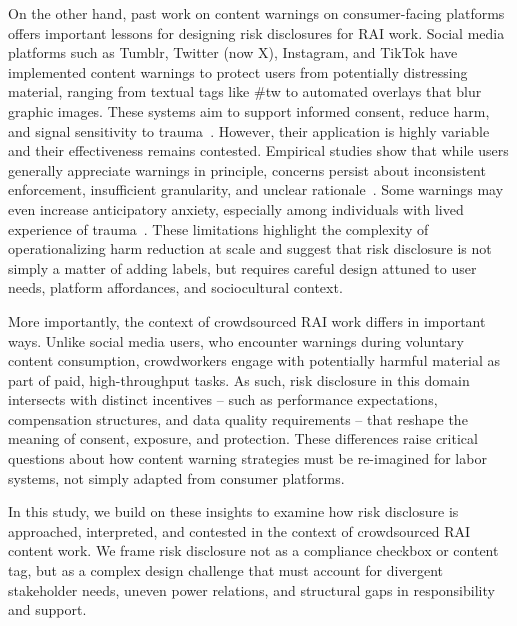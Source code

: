 On the other hand, past work on content warnings on consumer-facing platforms offers important lessons for designing risk disclosures for RAI work. Social media platforms such as Tumblr, Twitter (now X), Instagram, and TikTok have implemented content warnings to protect users from potentially distressing material, ranging from textual tags like \#tw to automated overlays that blur graphic images. These systems aim to support informed consent, reduce harm, and signal sensitivity to trauma~\cite{Zhang2024PerceptionsTriggerWarnings, vit2025use}. However, their application is highly variable and their effectiveness remains contested. Empirical studies show that while users generally appreciate warnings in principle, concerns persist about inconsistent enforcement, insufficient granularity, and unclear rationale~\cite{charles2022typology, bridgland2024meta, bell2025warning}. Some warnings may even increase anticipatory anxiety, especially among individuals with lived experience of trauma~\cite{sharevski2022meaningful}. These limitations highlight the complexity of operationalizing harm reduction at scale and suggest that risk disclosure is not simply a matter of adding labels, but requires careful design attuned to user needs, platform affordances, and sociocultural context.

More importantly, the context of crowdsourced RAI work differs in important ways. Unlike social media users, who encounter warnings during voluntary content consumption, crowdworkers engage with potentially harmful material as part of paid, high-throughput tasks. As such, risk disclosure in this domain intersects with distinct incentives -- such as performance expectations, compensation structures, and data quality requirements -- that reshape the meaning of consent, exposure, and protection. These differences raise critical questions about how content warning strategies must be re-imagined for labor systems, not simply adapted from consumer platforms.

In this study, we build on these insights to examine how risk disclosure is approached, interpreted, and contested in the context of crowdsourced RAI content work. We frame risk disclosure not as a compliance checkbox or content tag, but as a complex design challenge that must account for divergent stakeholder needs, uneven power relations, and structural gaps in responsibility and support.

